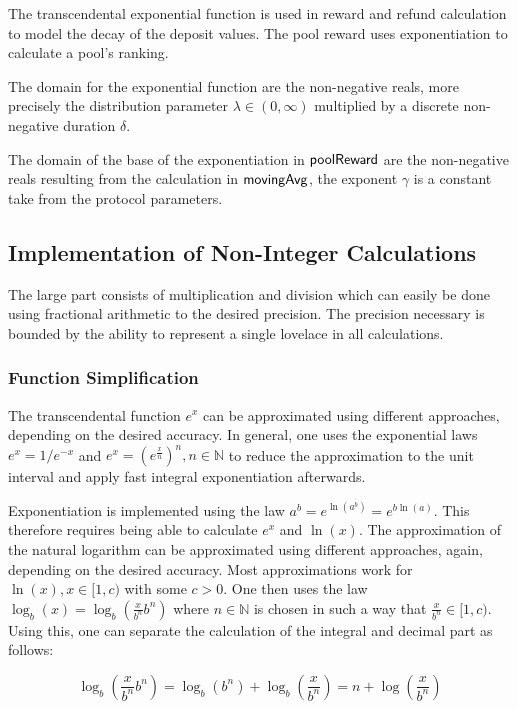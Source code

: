 The transcendental exponential function is used in reward and refund calculation
to model the decay of the deposit values. The pool reward uses exponentiation to
calculate a pool's ranking.

The domain for the exponential function are the non-negative reals, more
precisely the distribution parameter $\lambda \in (0, \infty)$ multiplied by a
discrete non-negative duration $\delta$.

The domain of the base of the exponentiation in $\mathsf{poolReward}$ are the
non-negative reals resulting from the calculation in $\mathsf{movingAvg}$, the
exponent $\gamma$ is a constant take from the protocol parameters.

\subsection{Implementation of Non-Integer Calculations}
\label{sec:impl-non-integ}

The large part consists of multiplication and division which can easily be done
using fractional arithmetic to the desired precision. The precision necessary is
bounded by the ability to represent a single lovelace in all calculations.

\subsubsection{Function Simplification}
\label{sec:funct-simpl}

The transcendental function $e^{x}$ can be approximated using different
approaches, depending on the desired accuracy. In general, one uses the
exponential laws $e^{x} = 1/e^{-x}$ and
$e^{x} = \left(e^{\frac{x}{n}} \right)^{n}, n \in \mathbb{N}$ to reduce the
approximation to the unit interval and apply fast integral exponentiation
afterwards.

Exponentiation is implemented using the law
$a^{b} = e^{\ln(a^{b})}= e^{b\ln(a)}$. This therefore requires being able to
calculate $e^{x}$ and $\ln(x)$. The approximation of the natural logarithm can
be approximated using different approaches, again, depending on the desired
accuracy. Most approximations work for $\ln(x), x \in [1, c)$ with some $c >
0$. One then uses the law $\log_{b}(x) = \log_{b}(\frac{x}{b^{n}}b^{n})$ where
$n \in \mathbb{N}$ is chosen in such a way that $\frac{x}{b^{n}} \in [1,
c)$. Using this, one can separate the calculation of the integral and decimal
part as follows:

\begin{equation*}
  \log_{b}(\frac{x}{b^{n}}b^{n})=\log_{b}(b^{n}) + \log_{b}(\frac{x}{b^{n}})=
  n + \log(\frac{x}{b^{n}})
\end{equation*}

